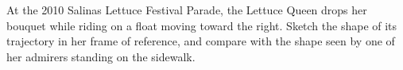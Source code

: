 At the 2010 Salinas Lettuce Festival Parade, the
Lettuce Queen drops her bouquet while riding on a float moving toward
the right. Sketch the shape of its trajectory in her frame of reference,
and compare with the shape seen by one of her admirers standing on the sidewalk.
